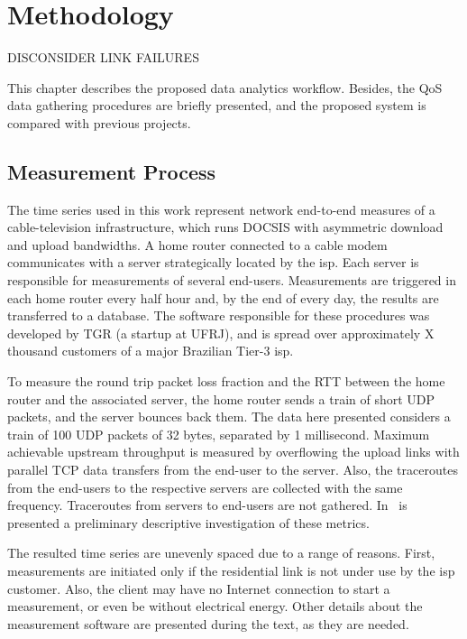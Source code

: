 \chapter{Methodology}
\label{chap:methodology}

DISCONSIDER LINK FAILURES

This chapter describes the proposed data analytics workflow.
Besides, the QoS data gathering procedures are briefly presented,
and the proposed system is compared with previous projects.

\section{Measurement Process}

The time series used in this work represent network end-to-end measures of a
cable-television infrastructure, which runs DOCSIS with asymmetric download and
upload bandwidths. A home router connected to a cable modem communicates
with a server strategically located by the \gls*{isp}\@. Each server is responsible
for measurements of several end-users.
Measurements are triggered in
each home router every half hour and, by the end of every day,
the results are transferred to a database.
The software responsible for these procedures was
developed by TGR (a startup at UFRJ),
and is spread over approximately X thousand customers of a major Brazilian
Tier-3 \gls*{isp}\@.

To measure the round
trip packet loss fraction and the RTT between the home router and the associated
server, the
home router sends a train of short UDP packets, and the server bounces back
them. The data here presented considers a train of 100 UDP packets of 32 bytes,
separated by 1 millisecond.
Maximum achievable upstream throughput is measured by overflowing the upload
links with parallel TCP data transfers from the end-user to the
server.
Also, the traceroutes from the end-users
to the respective servers are collected with the same frequency. Traceroutes
from servers to end-users are not gathered.
In~\cite{a_preliminary_performance_measurement_study_of_residential_broadband_services_in_brazil}
is presented a preliminary descriptive investigation of these metrics.

The resulted time series are unevenly spaced due to a range of reasons. First,
measurements are initiated only if the residential link is not under use by the
\gls*{isp} customer. Also, the client may have no Internet connection to start a
measurement, or even be without electrical energy. Other details about the
measurement software are presented during the text, as they are needed.

